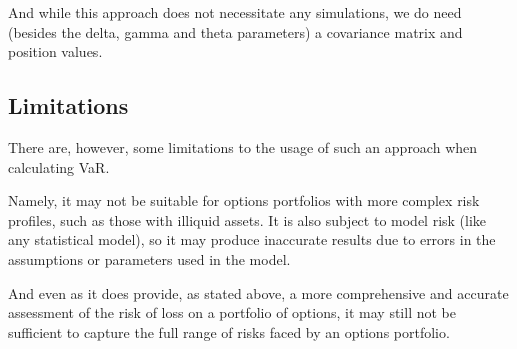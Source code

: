 \documentclass[a4paper, 12pt]{article}
\theoremstyle{definition}
\theoremstyle{plain}
\begin{document}
And while this approach does not necessitate any simulations,
we do need (besides the delta, gamma and theta 
parameters) a covariance matrix and position values. 





\subsection{Limitations}

There are, however, some limitations to the usage of such an approach
when calculating VaR. 

Namely, it may not be suitable for options portfolios with more complex 
risk profiles, such as those with illiquid assets. 
It is also subject to model risk (like any statistical model),
so it may produce inaccurate results due to errors in the 
assumptions or parameters used in the model.

And even as it does provide, as stated above, 
a more comprehensive and accurate assessment of the risk 
of loss on a portfolio of options, it may still not be 
sufficient to capture the full range of risks faced by 
an options portfolio.
\end{document}
